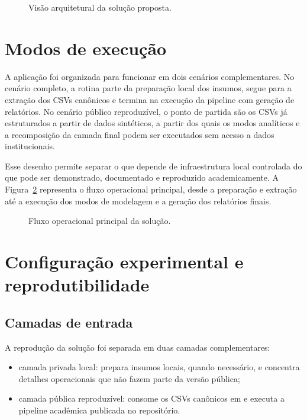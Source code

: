 \begin{figure}[H]
\caption{Vis\~ao arquitetural da solu\c{c}\~ao proposta.}
\label{fig:arquitetura-solucao}
\centering
{}
\end{figure}

\section{Modos de execu\c{c}\~ao}
\label{sec:modos}

A aplica\c{c}\~ao foi organizada para funcionar em dois cen\'arios complementares. No cen\'ario completo, a rotina parte da prepara\c{c}\~ao local dos insumos, segue para a extra\c{c}\~ao dos CSVs can\^onicos e termina na execu\c{c}\~ao da pipeline com gera\c{c}\~ao de relat\'orios. No cen\'ario p\'ublico reproduz\'ivel, o ponto de partida s\~ao os CSVs j\'a estruturados a partir de dados sintéticos, a partir dos quais os modos anal\'iticos e a recomposi\c{c}\~ao da camada final podem ser executados sem acesso a dados institucionais.

Esse desenho permite separar o que depende de infraestrutura local controlada do que pode ser demonstrado, documentado e reproduzido academicamente. A Figura~\ref{fig:fluxo-pipeline} representa o fluxo operacional principal, desde a prepara\c{c}\~ao e extra\c{c}\~ao at\'e a execu\c{c}\~ao dos modos de modelagem e a gera\c{c}\~ao dos relat\'orios finais.

\begin{figure}[H]
\caption{Fluxo operacional principal da solu\c{c}\~ao.}
\label{fig:fluxo-pipeline}
\centering
{}
\end{figure}

\section{Configura\c{c}\~ao experimental e reprodutibilidade}
\label{sec:config-experimental}

\subsection{Camadas de entrada}

A reprodu\c{c}\~ao da solu\c{c}\~ao foi separada em duas camadas complementares:
\begin{itemize}
    \item camada privada local: prepara insumos locais, quando necess\'ario, e concentra detalhes operacionais que n\~ao fazem parte da vers\~ao p\'ublica;
    \item camada p\'ublica reproduz\'ivel: consome os CSVs can\^onicos em  e executa a pipeline acad\^emica publicada no reposit\'orio.
\end{itemize}

